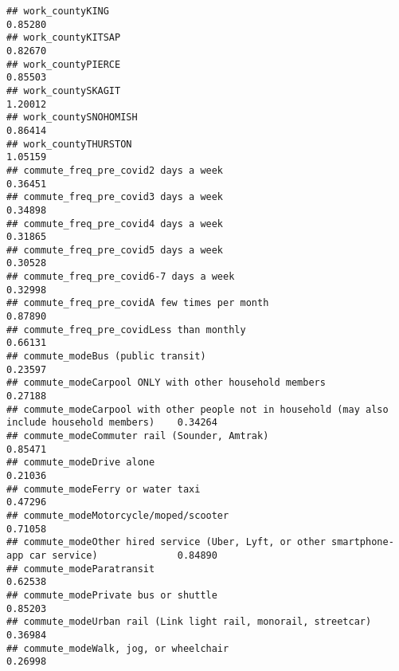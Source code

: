 \documentclass[
]{article}
\begin{document}
\begin{verbatim}
## work_countyKING                                                                                0.85280
## work_countyKITSAP                                                                              0.82670
## work_countyPIERCE                                                                              0.85503
## work_countySKAGIT                                                                              1.20012
## work_countySNOHOMISH                                                                           0.86414
## work_countyTHURSTON                                                                            1.05159
## commute_freq_pre_covid2 days a week                                                            0.36451
## commute_freq_pre_covid3 days a week                                                            0.34898
## commute_freq_pre_covid4 days a week                                                            0.31865
## commute_freq_pre_covid5 days a week                                                            0.30528
## commute_freq_pre_covid6-7 days a week                                                          0.32998
## commute_freq_pre_covidA few times per month                                                    0.87890
## commute_freq_pre_covidLess than monthly                                                        0.66131
## commute_modeBus (public transit)                                                               0.23597
## commute_modeCarpool ONLY with other household members                                          0.27188
## commute_modeCarpool with other people not in household (may also include household members)    0.34264
## commute_modeCommuter rail (Sounder, Amtrak)                                                    0.85471
## commute_modeDrive alone                                                                        0.21036
## commute_modeFerry or water taxi                                                                0.47296
## commute_modeMotorcycle/moped/scooter                                                           0.71058
## commute_modeOther hired service (Uber, Lyft, or other smartphone-app car service)              0.84890
## commute_modeParatransit                                                                        0.62538
## commute_modePrivate bus or shuttle                                                             0.85203
## commute_modeUrban rail (Link light rail, monorail, streetcar)                                  0.36984
## commute_modeWalk, jog, or wheelchair                                                           0.26998

\end{verbatim}
\end{document}
